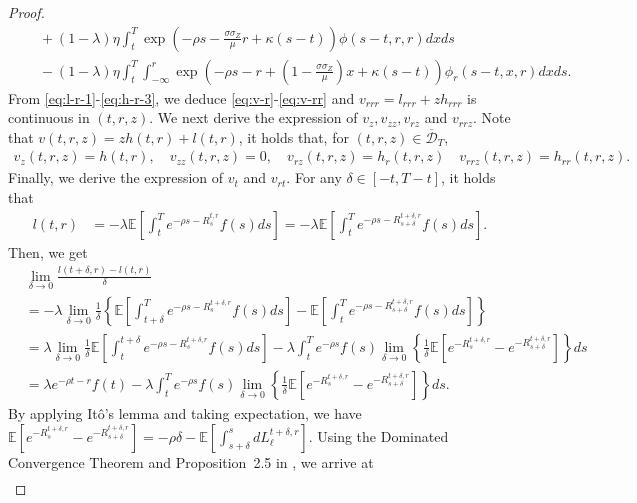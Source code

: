 \documentclass[11pt,times,letter]{article}
\newcommand{\Ex}{ \mathbb{E} }
\numberwithin{equation}{section}
\begin{document}
\begin{proof}
\begin{align}
&\quad+(1-\lambda)\eta\int_{t}^{T} \exp\left(-\rho s-\frac{\sigma\sigma_Z}{\mu}r+\kappa(s-t)\right) \phi(s-t,r,r)dx ds\label{eq:h-r-3}\\
&\quad-(1-\lambda)\eta\int_{t}^{T}\int_{-\infty}^{r} \exp\left(-\rho s-r+\left(1-\frac{\sigma\sigma_Z}{\mu}\right)x+\kappa(s-t)\right) \phi_r(s-t,x,r)dx ds.\nonumber
\end{align}
From \eqref{eq:l-r-1}-\eqref{eq:h-r-3}, we deduce \eqref{eq:v-r}-\eqref{eq:v-rr} and $v_{rrr}=l_{rrr}+zh_{rrr}$ is continuous in $(t,r,z)$. We next derive the expression of $v_z,v_{zz},v_{rz}$ and $v_{rrz}$. Note that  $v(t,r,z)=zh(t,r)+l(t,r)$, it holds that, for $(t,r,z)\in\overline{\mathcal{D}}_T$,
\begin{align}\label{eq:v-z}
v_z(t,r,z)=h(t,r),\quad v_{zz}(t,r,z)=0,\quad v_{rz}(t,r,z)=h_r(t,r,z)\quad v_{rrz}(t,r,z)=h_{rr}(t,r,z).
\end{align}
Finally, we derive the expression of $v_t$ and $v_{rt}$. For any $\delta\in[-t,T-t]$, it holds that
\begin{align*}
l(t,r)&=-\lambda \Ex\left[\int_{t}^T e^{-\rho s-R_s^{t,r}}f(s)ds\right]=-\lambda \Ex\left[\int_{t}^{T}e^{-\rho s-R_{s+\delta}^{t+\delta,r}}f(s)ds\right].
\end{align*}
Then, we get
\begin{align*}
&\lim_{\delta\to 0}\frac{l(t+\delta,r)-l(t,r)}{\delta}\\
&=-\lambda \lim_{\delta\to 0}\frac{1}{\delta}\left\{ \Ex\left[\int_{t+\delta}^{T} e^{-\rho s-R_{s}^{t+\delta,r}}f(s)ds\right]-\Ex\left[ \int_t^Te^{-\rho s-R^{t+\delta,r}_{s+\delta}}f(s)ds\right] \right\}\\
&=\lambda\lim_{\delta\to 0}\frac{1}{\delta}\Ex\left[\int_t^{t+\delta}e^{-\rho s-R_{s}^{t+\delta,r}}f(s)ds\right]-\lambda  \int_{t}^{T} e^{-\rho s}f(s)\lim_{\delta\to 0}\left\{\frac{1}{\delta}\Ex\left[e^{-R_{s}^{t+\delta,r}}-e^{-R^{t+\delta,r}_{s+\delta}}\right]\right\}ds\\
&=\lambda e^{-\rho t-r}f(t)-\lambda  \int_{t}^{T} e^{-\rho s}f(s)\lim_{\delta\to 0}\left\{\frac{1}{\delta}\Ex\left[e^{-R_{s}^{t+\delta,r}}-e^{-R^{t+\delta,r}_{s+\delta}}\right]\right\}ds.
\end{align*}
By applying It\^o's lemma and taking expectation, we have $\Ex\left[e^{-R_{s}^{t+\delta,r}}-e^{-R^{t+\delta,r}_{s+\delta}}\right]=-\rho \delta-\Ex\left[\int_{s+\delta}^s  dL_{\ell}^{t+\delta,r}\right]$. Using the Dominated Convergence Theorem and Proposition~2.5 in \cite{Abraham2000}, we arrive at
\begin{align}\label{eq:l-t-1}

\end{align}
\end{proof}
\end{document}
